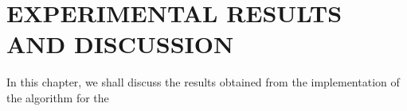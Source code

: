 \chapter{EXPERIMENTAL RESULTS AND DISCUSSION}
In this chapter, we shall discuss the results obtained from the implementation of the algorithm for the 